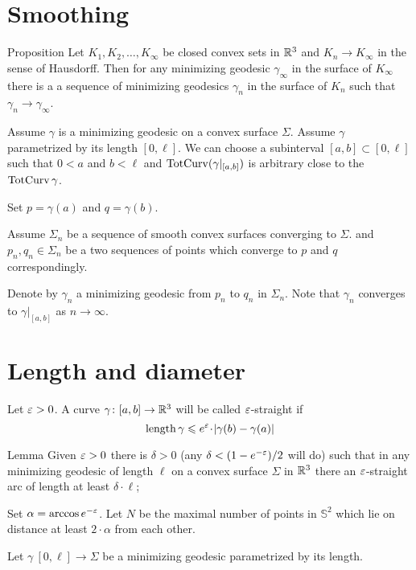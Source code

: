 \documentclass[a4paper,10pt]{amsart}
\begin{document}
\section{Smoothing}

\begin{thm}{Proposition}\label{prop:smooth}
Let $K_1,K_2,\dots,K_\infty$ be closed convex sets in $\mathbb{R}^3$
and $K_n\to K_\infty$ in the sense of Hausdorff.
Then for any minimizing geodesic $\gamma_\infty$ in the surface of $K_\infty$
there is a a sequence of minimizing geodesics $\gamma_n$ in the surface of $K_n$ such that  $\gamma_n\to\gamma_\infty$.
\end{thm}

Assume $\gamma$ is a minimizing geodesic on a convex surface $\Sigma$.
Assume $\gamma$ parametrized by its length $[0,\ell]$.
We can choose a subinterval $[a,b]\subset [0,\ell]$
such that $0<a$ and $b<\ell$
and $\mathop{\rm TotCurv}\nolimits(\gamma|_{[a,b]})$ is arbitrary close to the $\mathop{\rm TotCurv}\nolimits \gamma$.

Set $p=\gamma(a)$ and $q=\gamma(b)$.

Assume $\Sigma_n$ be a sequence of smooth convex surfaces converging to $\Sigma$.
and $p_n,q_n\in\Sigma_n$ be a two sequences of points which converge to $p$ and $q$ 
correspondingly.

Denote by $\gamma_n$ a minimizing geodesic from $p_n$ to $q_n$ in $\Sigma_n$.
Note that $\gamma_n$ converges to $\gamma|_{[a,b]}$
as $n\to\infty$.
\qeds

\section{Length and diameter}

Let $\varepsilon>0$.
A curve $\gamma\colon[a,b]\to\mathbb{R}^3$ will be called $\varepsilon$-straight
if 
\[\length \gamma\le e^\eps\cdot|\gamma(b)-\gamma(a)|\]

\begin{thm}{Lemma}\label{lem:eps-straight}
Given $\varepsilon>0$ there is $\delta>0$ (any  $\delta<(1-e^{-\varepsilon})/2$ will do)
such that
in any minimizing geodesic of length $\ell$
on a convex surface $\Sigma$ in $\mathbb{R}^3$ there an $\varepsilon$-straight arc of length at least $\delta\cdot\ell$;
\end{thm}

Set $\alpha=\arccos e^{-\varepsilon}$.
Let $N$ be the maximal number of points in $\mathbb S^2$ which lie on distance at least $2\cdot\alpha$ from each other.

Let $\gamma\:[0,\ell]\to \Sigma$ be a minimizing geodesic parametrized by its length.
\end{document}
